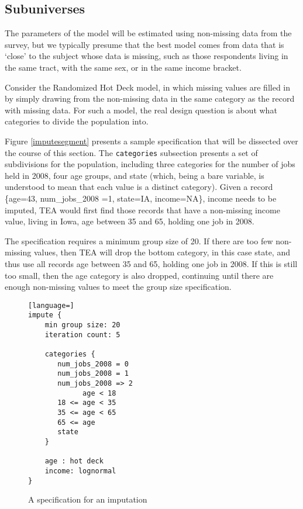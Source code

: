 \documentclass{article}
\begin{document}
\subsection{Subuniverses}
The parameters of the model will be estimated using non-missing data from the survey, 
but we typically presume that the best model comes from data that is `close' to the
subject whose data is missing, such as those respondents living in the same tract, with
the same sex, or in the same income bracket. 

Consider the Randomized Hot Deck model, in which missing values are filled in by simply
drawing from the non-missing data in the same category as the record with missing data.
For such a model, the real design question is about what categories to divide the
population into.


Figure \ref{imputesegment} presents a sample specification that will be dissected over the
course of this section. The {\tt categories} subsection presents a set of subdivisions for
the population, including three categories for the number of jobs held in 2008, four age
groups, and state (which, being a bare variable, is understood to mean that each value is
a distinct category). Given a record \{age=43, num\_jobs\_2008 =1, state=IA, income=NA\},
income needs to be imputed, TEA would first find those records that have a non-missing
income value, living in Iowa, age between 35 and 65, holding one job in 2008. 

The specification requires a minimum group size of 20. If there are too few non-missing
values, then TEA will drop the bottom category, in this case state, and thus use all
records age between 35 and 65, holding one job in 2008. If this is still too small, then
the age category is also dropped, continuing until there are enough non-missing values to
meet the group size specification.

\begin{figure}
\begin{lstlisting}[language=]
impute {
    min group size: 20
    iteration count: 5

    categories {
       num_jobs_2008 = 0
       num_jobs_2008 = 1
       num_jobs_2008 => 2
             age < 18
       18 <= age < 35
       35 <= age < 65
       65 <= age
       state
    }

    age : hot deck
    income: lognormal
}
\end{lstlisting}
\caption{A specification for an imputation}
\end{figure}
\end{document}
